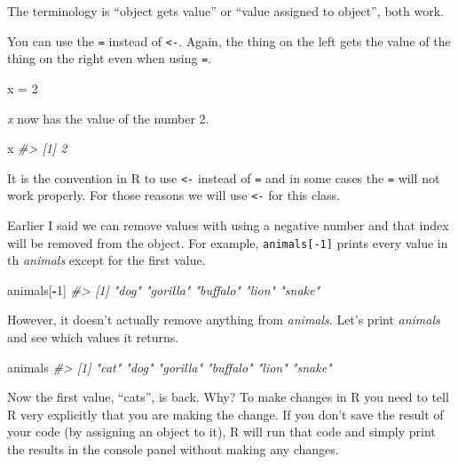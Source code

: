 \documentclass[
  12pt,
]{book}
\newenvironment{Shaded}{\begin{snugshade}}{\end{snugshade}}
\newcommand{\CommentTok}[1]{\textcolor[rgb]{0.56,0.35,0.01}{\textit{#1}}}
\newcommand{\DecValTok}[1]{\textcolor[rgb]{0.00,0.00,0.81}{#1}}
\newcommand{\NormalTok}[1]{#1}
\newcommand{\OperatorTok}[1]{\textcolor[rgb]{0.81,0.36,0.00}{\textbf{#1}}}
\newcommand{\StringTok}[1]{\textcolor[rgb]{0.31,0.60,0.02}{#1}}
\begin{document}
The terminology is ``object gets value'' or ``value assigned to object'', both work.

You can use the \texttt{=} instead of \texttt{\textless{}-}. Again, the thing on the left gets the value of the thing on the right even when using \texttt{=}.

\begin{Shaded}
\begin{Highlighting}[]
\NormalTok{x =}\StringTok{ }\DecValTok{2}
\end{Highlighting}
\end{Shaded}

\emph{x} now has the value of the number 2.

\begin{Shaded}
\begin{Highlighting}[]
\NormalTok{x}
\CommentTok{\#> [1] 2}
\end{Highlighting}
\end{Shaded}

It is the convention in R to use \texttt{\textless{}-} instead of \texttt{=} and in some cases the \texttt{=} will not work properly. For those reasons we will use \texttt{\textless{}-} for this class.

Earlier I said we can remove values with using a negative number and that index will be removed from the object. For example, \texttt{animals{[}-1{]}} prints every value in th \emph{animals} except for the first value.

\begin{Shaded}
\begin{Highlighting}[]
\NormalTok{animals[}\OperatorTok{{-}}\DecValTok{1}\NormalTok{]}
\CommentTok{\#> [1] "dog"     "gorilla" "buffalo" "lion"    "snake"}
\end{Highlighting}
\end{Shaded}

However, it doesn't actually remove anything from \emph{animals}. Let's print \emph{animals} and see which values it returns.

\begin{Shaded}
\begin{Highlighting}[]
\NormalTok{animals}
\CommentTok{\#> [1] "cat"     "dog"     "gorilla" "buffalo" "lion"    "snake"}
\end{Highlighting}
\end{Shaded}

Now the first value, ``cats'', is back. Why? To make changes in R you need to tell R very explicitly that you are making the change. If you don't save the result of your code (by assigning an object to it), R will run that code and simply print the results in the console panel without making any changes.
\end{document}
